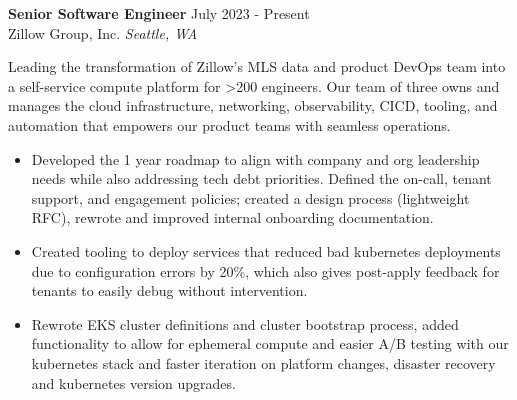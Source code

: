 \begin{mdframed}[linewidth=2,linecolor=blue, innertopmargin=1em, innerbottommargin=1em, topline=false, rightline=false, bottomline=false]
\textbf{Senior Software Engineer} \hfill July 2023 - Present\\
Zillow Group, Inc. \hfill \textit{Seattle, WA}

Leading the transformation of Zillow’s MLS data and product DevOps team into a self-service compute platform for >200 engineers. Our team of three owns and manages the cloud infrastructure, networking, observability, CICD, tooling, and automation that empowers our product teams with seamless operations.
\begin{itemize}
    \item Developed the 1 year roadmap to align with company and org leadership needs while also addressing tech debt priorities. Defined the on-call, tenant support, and engagement policies; created a design process (lightweight RFC), rewrote and improved internal onboarding documentation.
    \item Created tooling to deploy services that reduced bad kubernetes deployments due to configuration errors by 20\%, which also gives post-apply feedback for tenants to easily debug without intervention.
    \item Rewrote EKS cluster definitions and cluster bootstrap process, added functionality to allow for ephemeral compute and easier A/B testing with our kubernetes stack and faster iteration on platform changes, disaster recovery and kubernetes version upgrades.
\end{itemize}
\end{mdframed}
